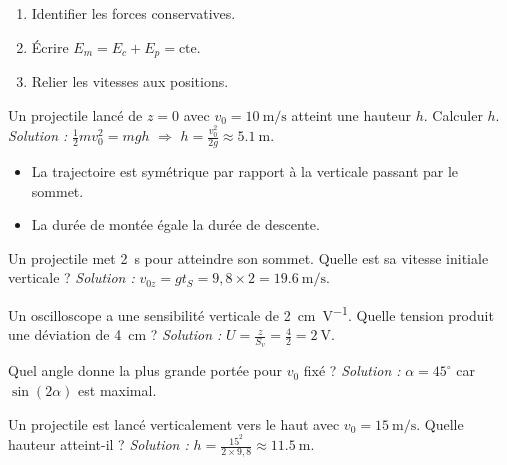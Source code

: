 \begin{enumerate}
\item Identifier les forces conservatives.
\item Écrire $E_m = E_c + E_p = \text{cte}$.
\item Relier les vitesses aux positions.
\end{enumerate}
\begin{exemple}
Un projectile lancé de $z=0$ avec $v_0=\SI{10}{\metre\per\second}$ atteint une hauteur $h$. Calculer $h$.
\emph{Solution :} $\frac12 m v_0^2 = mgh$ $\Rightarrow$ $h = \frac{v_0^2}{2g} \approx \SI{5,1}{\metre}$.
\end{exemple}

\begin{itemize}
\item La trajectoire est symétrique par rapport à la verticale passant par le sommet.
\item La durée de montée égale la durée de descente.
\end{itemize}
\begin{exemple}
Un projectile met \SI{2}{\second} pour atteindre son sommet. Quelle est sa vitesse initiale verticale ?
\emph{Solution :} $v_{0z}=g t_S = 9,8\times2 = \SI{19,6}{\metre\per\second}$.
\end{exemple}

\begin{exemple}
Un oscilloscope a une sensibilité verticale de \SI{2}{\centi\metre\per\volt}. Quelle tension produit une déviation de \SI{4}{\centi\metre} ?
\emph{Solution :} $U = \frac{z}{S_v} = \frac{4}{2} = \SI{2}{\volt}$.
\end{exemple}

\begin{exemple}
Quel angle donne la plus grande portée pour $v_0$ fixé ?
\emph{Solution :} $\alpha=45^\circ$ car $\sin(2\alpha)$ est maximal.
\end{exemple}

\begin{exemple}
Un projectile est lancé verticalement vers le haut avec $v_0=\SI{15}{\metre\per\second}$. Quelle hauteur atteint-il ?
\emph{Solution :} $h = \frac{15^2}{2\times9,8} \approx \SI{11,5}{\metre}$.
\end{exemple}

